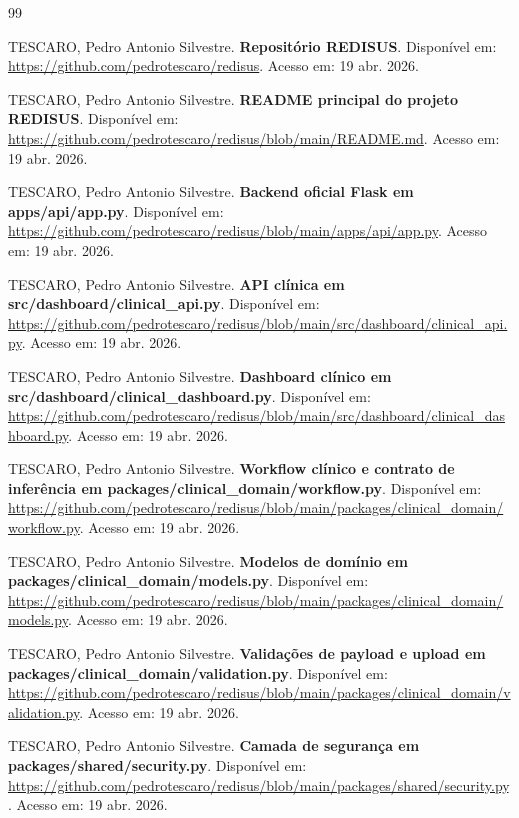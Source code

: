 \documentclass[
    12pt,
    openright,
    oneside,
    a4paper,
    chapter=TITLE,
    section=TITLE,
    brazil,
    sumario=tradicional,
    hidelinks
]{abntex2}
\begin{document}
\begin{thebibliography}{99}

TESCARO, Pedro Antonio Silvestre. \textbf{Reposit\'orio REDISUS}. Dispon\'ivel em: \url{https://github.com/pedrotescaro/redisus}. Acesso em: 19 abr. 2026.

TESCARO, Pedro Antonio Silvestre. \textbf{README principal do projeto REDISUS}. Dispon\'ivel em: \url{https://github.com/pedrotescaro/redisus/blob/main/README.md}. Acesso em: 19 abr. 2026.

TESCARO, Pedro Antonio Silvestre. \textbf{Backend oficial Flask em apps/api/app.py}. Dispon\'ivel em: \url{https://github.com/pedrotescaro/redisus/blob/main/apps/api/app.py}. Acesso em: 19 abr. 2026.

TESCARO, Pedro Antonio Silvestre. \textbf{API cl\'inica em src/dashboard/clinical\_api.py}. Dispon\'ivel em: \url{https://github.com/pedrotescaro/redisus/blob/main/src/dashboard/clinical_api.py}. Acesso em: 19 abr. 2026.

TESCARO, Pedro Antonio Silvestre. \textbf{Dashboard cl\'inico em src/dashboard/clinical\_dashboard.py}. Dispon\'ivel em: \url{https://github.com/pedrotescaro/redisus/blob/main/src/dashboard/clinical_dashboard.py}. Acesso em: 19 abr. 2026.

TESCARO, Pedro Antonio Silvestre. \textbf{Workflow cl\'inico e contrato de infer\^encia em packages/clinical\_domain/workflow.py}. Dispon\'ivel em: \url{https://github.com/pedrotescaro/redisus/blob/main/packages/clinical_domain/workflow.py}. Acesso em: 19 abr. 2026.

TESCARO, Pedro Antonio Silvestre. \textbf{Modelos de dom\'inio em packages/clinical\_domain/models.py}. Dispon\'ivel em: \url{https://github.com/pedrotescaro/redisus/blob/main/packages/clinical_domain/models.py}. Acesso em: 19 abr. 2026.

TESCARO, Pedro Antonio Silvestre. \textbf{Valida\c{c}\~oes de payload e upload em packages/clinical\_domain/validation.py}. Dispon\'ivel em: \url{https://github.com/pedrotescaro/redisus/blob/main/packages/clinical_domain/validation.py}. Acesso em: 19 abr. 2026.

TESCARO, Pedro Antonio Silvestre. \textbf{Camada de seguran\c{c}a em packages/shared/security.py}. Dispon\'ivel em: \url{https://github.com/pedrotescaro/redisus/blob/main/packages/shared/security.py}. Acesso em: 19 abr. 2026.


\end{thebibliography}
\end{document}
